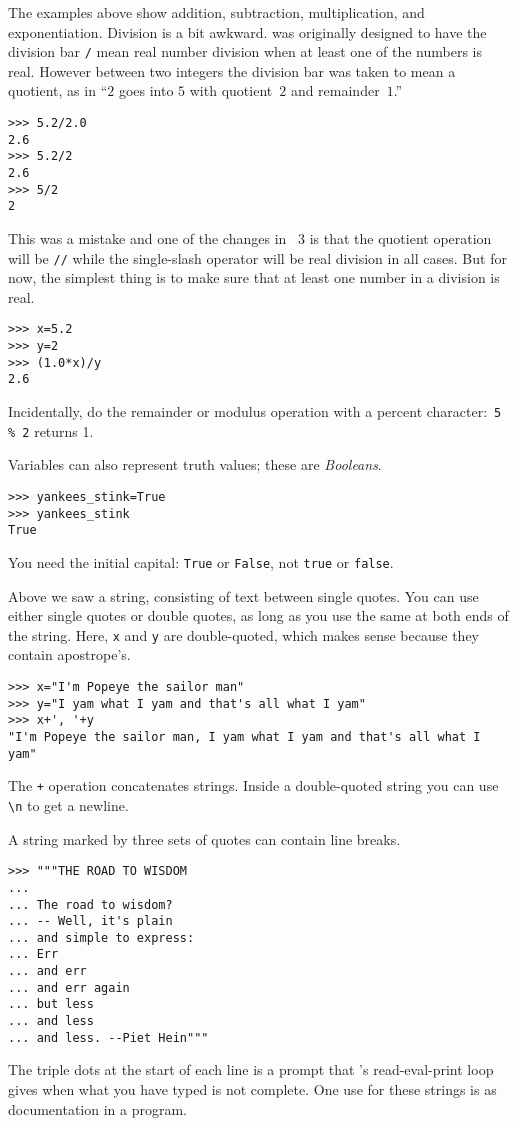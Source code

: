 The examples above show addition, subtraction, multiplication, 
and exponentiation. 
Division is a bit awkward.
\python{} was originally designed to have the division bar
\lstinline[style=inline]!/! mean real number division 
when at least one of the numbers is real.
However between two integers the division bar was taken to mean 
a quotient, as in ``$2$ goes into $5$ with quotient~$2$ and remainder~$1$.''
\begin{lstlisting}[style=python]
>>> 5.2/2.0
2.6
>>> 5.2/2
2.6
>>> 5/2
2
\end{lstlisting}
This was a mistake and one of the changes in \python~3
is that the quotient operation will be \lstinline[style=inline]!//!
while the single-slash operator will be real division in all cases.
But for now, the simplest thing is to make sure that at least one
number in a division is real.
\begin{lstlisting}[style=python]
>>> x=5.2
>>> y=2
>>> (1.0*x)/y
2.6
\end{lstlisting}
Incidentally, do the remainder or modulus operation  
with a percent character:~\lstinline[style=inline]!5 % 2! returns 1.

Variables can also represent truth values; these are \textit{Booleans}.
\begin{lstlisting}[style=python]
>>> yankees_stink=True
>>> yankees_stink
True
\end{lstlisting}
You need the initial capital:
\lstinline[style=inline]!True!
or \lstinline[style=inline]!False!, not
\lstinline[style=inline]!true!
or \lstinline[style=inline]!false!.
 
Above we saw a string, consisting of text between single quotes.
You can use either single quotes or double quotes, as long as you use
the same at both ends of the string. 
Here, \lstinline[style=inline]!x! and \lstinline[style=inline]!y!
are double-quoted, which makes sense because they contain apostrope's. 
\begin{lstlisting}[style=python]
>>> x="I'm Popeye the sailor man"
>>> y="I yam what I yam and that's all what I yam"
>>> x+', '+y
"I'm Popeye the sailor man, I yam what I yam and that's all what I yam"
\end{lstlisting}
The \lstinline[style=inline]!+! operation concatenates strings.
Inside a double-quoted string you can use \lstinline[style=inline]!\n! to
get a newline.

A string marked by three sets of quotes can contain line breaks.
\begin{lstlisting}[style=python]
>>> """THE ROAD TO WISDOM
... 
... The road to wisdom?
... -- Well, it's plain
... and simple to express:
... Err
... and err
... and err again
... but less
... and less
... and less. --Piet Hein"""
\end{lstlisting}
The triple dots at the start of each line is a prompt that \python's
read-eval-print loop gives when what you have typed is not complete.
One use for these strings is as documentation in a program.


